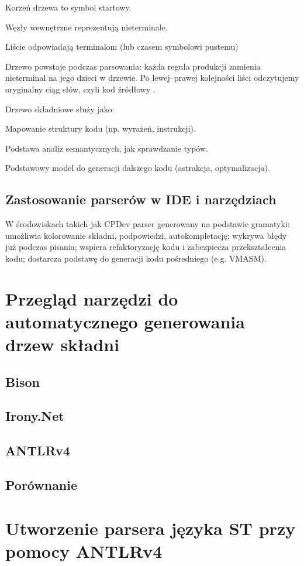 \documentclass[12pt,twoside]{article}
\begin{document}
Korzeń drzewa to symbol startowy.

Węzły wewnętrzne reprezentują nieterminale.

Liście odpowiadają terminalom (lub czasem symbolowi pustemu)

Drzewo powstaje podczas parsowania: każda reguła produkcji zamienia nieterminal na jego dzieci w drzewie. Po lewej–prawej kolejności liści odczytujemy oryginalny ciąg słów, czyli kod źródłowy .

Drzewo składniowe służy jako:

Mapowanie struktury kodu (np. wyrażeń, instrukcji).

Podstawa analiz semantycznych, jak sprawdzanie typów.

Podstawowy model do generacji dalszego kodu (astrakcja, optymalizacja).

\subsection{Zastosowanie parserów w IDE i narzędziach}
W środowiskach takich jak CPDev parser generowany na podstawie gramatyki:
umożliwia kolorowanie składni, podpowiedzi, autokompletację;
wykrywa błędy już podczas pisania;
wspiera refaktoryzację kodu i zabezpiecza przekształcenia kodu;
dostarcza podstawę do generacji kodu pośredniego (e.g. VMASM).
\clearpage

\section{Przegląd narzędzi do automatycznego generowania drzew składni}
\subsection{Bison}
\subsection{Irony.Net}
\subsection{ANTLRv4}
\subsection{Porównanie}
\clearpage
\section{Utworzenie parsera języka ST przy pomocy ANTLRv4}
\end{document}
